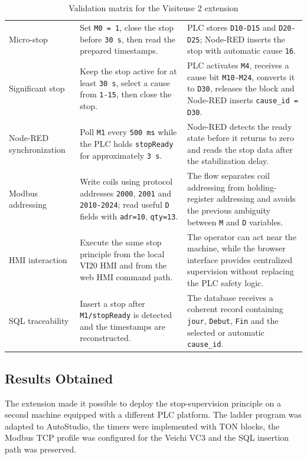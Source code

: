 \begin{table}[H]
\centering
\caption{Validation matrix for the Visiteuse 2 extension}
\begin{tabularx}{\textwidth}{|P{0.24\textwidth}|P{0.34\textwidth}|Y|}
\hline
{}
 &  &  \\
\hline
Micro-stop & Set \texttt{M0 = 1}, close the stop before \texttt{30 s}, then read the prepared timestamps. & PLC stores \texttt{D10-D15} and \texttt{D20-D25}; Node-RED inserts the stop with automatic cause \texttt{16}. \\
\hline
Significant stop & Keep the stop active for at least \texttt{30 s}, select a cause from \texttt{1-15}, then close the stop. & PLC activates \texttt{M4}, receives a cause bit \texttt{M10-M24}, converts it to \texttt{D30}, releases the block and Node-RED inserts \texttt{cause\_id = D30}. \\
\hline
Node-RED synchronization & Poll \texttt{M1} every \texttt{500 ms} while the PLC holds \texttt{stopReady} for approximately \texttt{3 s}. & Node-RED detects the ready state before it returns to zero and reads the stop data after the stabilization delay. \\
\hline
Modbus addressing & Write coils using protocol addresses \texttt{2000}, \texttt{2001} and \texttt{2010-2024}; read useful \texttt{D} fields with \texttt{adr=10}, \texttt{qty=13}. & The flow separates coil addressing from holding-register addressing and avoids the previous ambiguity between \texttt{M} and \texttt{D} variables. \\
\hline
HMI interaction & Execute the same stop principle from the local VI20 HMI and from the web HMI command path. & The operator can act near the machine, while the browser interface provides centralized supervision without replacing the PLC safety logic. \\
\hline
SQL traceability & Insert a stop after \texttt{M1/stopReady} is detected and the timestamps are reconstructed. & The database receives a coherent record containing \texttt{jour}, \texttt{Debut}, \texttt{Fin} and the selected or automatic \texttt{cause\_id}. \\
\hline
\end{tabularx}
\end{table}

\subsection{Results Obtained}
The extension made it possible to deploy the stop-supervision principle on a second machine equipped with a different PLC platform. The ladder program was adapted to AutoStudio, the timers were implemented with TON blocks, the Modbus TCP profile was configured for the Veichi VC3 and the SQL insertion path was preserved.

